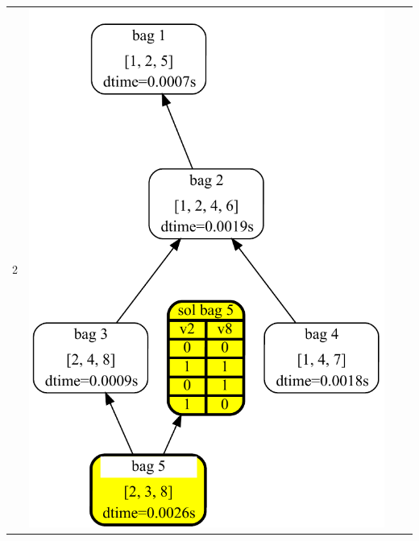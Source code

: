 \documentclass[a4paper, 12pt, bibliography=totoc]{scrartcl}
\begin{document}
\begin{table}\sffamily
\begin{tabular}{l*3{c}}

	2 & \includegraphics[height=0.46\textheight]{images/DA4SAT/results/TDStep2.pdf} &

\end{tabular}
\end{table}
\end{document}
